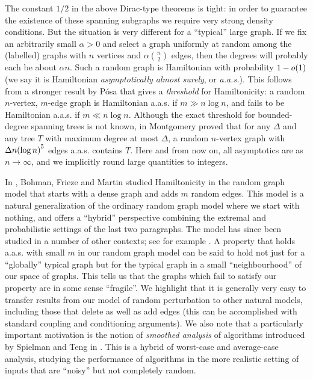 \documentclass[11pt,english]{article}
\theoremstyle{plain}
\theoremstyle{plain}
\theoremstyle{plain}
\theoremstyle{plain}
\theoremstyle{plain}
\theoremstyle{definition}
\theoremstyle{definition}
\theoremstyle{remark}
\theoremstyle{remark}
\theoremstyle{plain}
\theoremstyle{definition}
\theoremstyle{definition}
\theoremstyle{plain}
\theoremstyle{plain}
\theoremstyle{plain}
\theoremstyle{plain}
\theoremstyle{remark}
\theoremstyle{plain}
\theoremstyle{definition}
\let\originalleft\left
\let\originalright\right
\renewcommand{\left}{\mathopen{}\mathclose\bgroup\originalleft}
\renewcommand{\right}{\aftergroup\egroup\originalright}
\begin{document}
The constant $1/2$ in the above Dirac-type theorems is tight: in
order to guarantee the existence of these spanning subgraphs we require
very strong density conditions. But the situation is very different
for a ``typical'' large graph. If we fix an arbitrarily small $\alpha>0$
and select a graph uniformly at random among the (labelled) graphs
with $n$ vertices and $\alpha{n \choose 2}$ edges, then the degrees
will probably each be about $\alpha n$. Such a random graph is Hamiltonian
with probability $1-o\left(1\right)$ (we say it is Hamiltonian \emph{asymptotically
almost surely}, or \emph{a.a.s.}). This follows from a stronger result
by P\'osa \cite{Pos76} that gives a \emph{threshold} for Hamiltonicity:
a random $n$-vertex, $m$-edge graph is Hamiltonian a.a.s. if $m\gg n\log n$,
and fails to be Hamiltonian a.a.s. if $m\ll n\log n$. Although the
exact threshold for bounded-degree spanning trees is not known, in
\cite{Mon14} Montgomery proved that for any $\Delta$ and any tree
$T$ with maximum degree at most $\Delta$, a random $n$-vertex graph
with $\Delta n\left(\log n\right)^{5}$ edges a.a.s. contains $T$.
Here and from now on, all asymptotics are as $n\to\infty$, and we
implicitly round large quantities to integers.

In \cite{BFM03}, Bohman, Frieze and Martin studied Hamiltonicity
in the random graph model that starts with a dense graph and adds
$m$ random edges. This model is a natural generalization of the ordinary
random graph model where we start with nothing, and offers a ``hybrid''
perspective combining the extremal and probabilistic settings of the
last two paragraphs. The model has since been studied in a number
of other contexts; see for example \cite{BHM04,KST06,KKS15}. A property
that holds a.a.s. with small $m$ in our random graph model can be
said to hold not just for a ``globally'' typical graph but for the
typical graph in a small ``neighbourhood'' of our space of graphs.
This tells us that the graphs which fail to satisfy our property are
in some sense ``fragile''. We highlight that it is generally very
easy to transfer results from our model of random perturbation to
other natural models, including those that delete as well as add edges
(this can be accomplished with standard coupling and conditioning
arguments). We also note that a particularly important motivation
is the notion of \emph{smoothed analysis} of algorithms introduced
by Spielman and Teng in \cite{ST04}. This is a hybrid of worst-case
and average-case analysis, studying the performance of algorithms
in the more realistic setting of inputs that are ``noisy'' but not
completely random.
\end{document}
